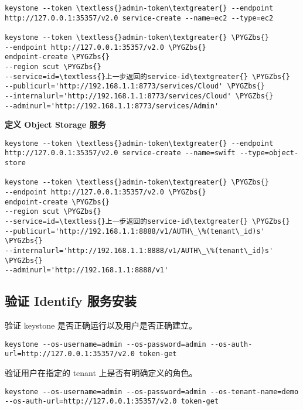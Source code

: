\documentclass[a4paper,12pt,english]{sphinxmanual}
\def\PYGZbs{\char`\\}
\begin{document}
\begin{Verbatim}[commandchars=\\\{\}]
keystone --token \textless{}admin-token\textgreater{} --endpoint http://127.0.0.1:35357/v2.0 service-create --name=ec2 --type=ec2

keystone --token \textless{}admin-token\textgreater{} \PYGZbs{}
--endpoint http://127.0.0.1:35357/v2.0 \PYGZbs{}
endpoint-create \PYGZbs{}
--region scut \PYGZbs{}
--service=id=\textless{}上一步返回的service-id\textgreater{} \PYGZbs{}
--publicurl='http://192.168.1.1:8773/services/Cloud' \PYGZbs{}
--internalurl='http://192.168.1.1:8773/services/Cloud' \PYGZbs{}
--adminurl='http://192.168.1.1:8773/services/Admin'
\end{Verbatim}

\textbf{定义 Object Storage 服务}

\begin{Verbatim}[commandchars=\\\{\}]
keystone --token \textless{}admin-token\textgreater{} --endpoint http://127.0.0.1:35357/v2.0 service-create --name=swift --type=object-store

keystone --token \textless{}admin-token\textgreater{} \PYGZbs{}
--endpoint http://127.0.0.1:35357/v2.0 \PYGZbs{}
endpoint-create \PYGZbs{}
--region scut \PYGZbs{}
--service=id=\textless{}上一步返回的service-id\textgreater{} \PYGZbs{}
--publicurl='http://192.168.1.1:8888/v1/AUTH\_\%(tenant\_id)s' \PYGZbs{}
--internalurl='http://192.168.1.1:8888/v1/AUTH\_\%(tenant\_id)s' \PYGZbs{}
--adminurl='http://192.168.1.1:8888/v1'
\end{Verbatim}


\subsection{验证 Identify 服务安装}
\label{keystone:identify}
验证 keystone 是否正确运行以及用户是否正确建立。

\begin{Verbatim}[commandchars=\\\{\}]
keystone --os-username=admin --os-password=admin --os-auth-url=http://127.0.0.1:35357/v2.0 token-get
\end{Verbatim}

验证用户在指定的 tenant 上是否有明确定义的角色。

\begin{Verbatim}[commandchars=\\\{\}]
keystone --os-username=admin --os-password=admin --os-tenant-name=demo --os-auth-url=http://127.0.0.1:35357/v2.0 token-get
\end{Verbatim}
\end{document}

